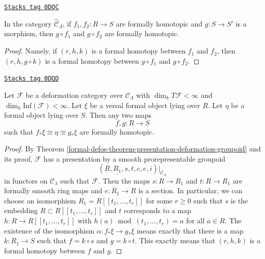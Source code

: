 \begin{lemma}
\label{formal-defos-lemma-composition-homotopic}
\href{https://stacks.math.columbia.edu/tag/0DQC}{\texttt{Stacks tag 0DQC}}

In the category $\widehat{\mathcal{C}}_\Lambda$, if $f_1, f_2 : R \to S$
are formally homotopic and $g : S \to S'$ is a morphism, then
$g \circ f_1$ and $g \circ f_2$ are formally homotopic.
\end{lemma}

\begin{proof}
Namely, if $(r, h, k)$ is a formal homotopy between $f_1$ and $f_2$, then
$(r, h, g \circ k)$ is a formal homotopy between $g \circ f_1$ and
$g \circ f_2$.
\end{proof}

\begin{lemma}
\label{formal-defos-lemma-versal-unique-up-to-homotopy}
\href{https://stacks.math.columbia.edu/tag/0DQD}{\texttt{Stacks tag 0DQD}}

Let $\mathcal{F}$ be a deformation category over $\mathcal{C}_\Lambda$
with $\dim_k T\mathcal{F} < \infty$ and
$\dim_k \text{Inf}(\mathcal{F}) < \infty$. Let $\xi$ be a versal formal
object lying over $R$. Let $\eta$ be a formal object lying over $S$.
Then any two maps
$$
f, g : R \to S
$$
such that $f_*\xi \cong \eta \cong g_*\xi$ are formally homotopic.
\end{lemma}

\begin{proof}
By Theorem \ref{formal-defos-theorem-presentation-deformation-groupoid}
and its proof, $\mathcal{F}$ has a presentation by
a smooth prorepresentable groupoid
$$
(\underline{R}, \underline{R_1}, s, t, c, e, i)|_{\mathcal{C}_\Lambda}
$$
in functors on $\mathcal{C}_\lambda$ such that $\mathcal{F}$.
Then the maps $s : R \to R_1$ and $t : R \to R_1$ are formally
smooth ring maps and $e : R_1 \to R$ is a section.
In particular, we can choose an isomorphism
$R_1 = R[[t_1, \ldots, t_r]]$ for some $r \geq 0$ such
that $s$ is the embedding $R \subset R[[t_1, \ldots, t_r]]$
and $t$ corresponds to a map $h : R \to R[[t_1, \ldots, t_r]]$
with $h(a) \bmod (t_1, \ldots, t_r) = a$ for all $a \in R$.
The existence of the isomorphism $\alpha : f_*\xi \to g_*\xi$
means exactly that there is a map $k : R_1 \to S$
such that $f = k \circ s$ and $g = k \circ t$.
This exactly means that $(r, h, k)$ is a formal homotopy between
$f$ and $g$.
\end{proof}

